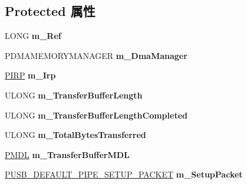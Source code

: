 \subsection*{Protected 属性}
\begin{DoxyCompactItemize}
\item 
\mbox{\label{class_c_u_s_b_request_aea79c036033f827d93c26d278507f997}} 
L\+O\+NG {\bfseries m\+\_\+\+Ref}
\item 
\mbox{\label{class_c_u_s_b_request_a667351393fa6f43d8e0aefec87b47b4f}} 
P\+D\+M\+A\+M\+E\+M\+O\+R\+Y\+M\+A\+N\+A\+G\+ER {\bfseries m\+\_\+\+Dma\+Manager}
\item 
\mbox{\label{class_c_u_s_b_request_a9645ef535d544a409654948efe0cfce8}} 
\hyperlink{interfacevoid}{P\+I\+RP} {\bfseries m\+\_\+\+Irp}
\item 
\mbox{\label{class_c_u_s_b_request_a9551657a034fbbcfe6aeb966f3c8d4b7}} 
U\+L\+O\+NG {\bfseries m\+\_\+\+Transfer\+Buffer\+Length}
\item 
\mbox{\label{class_c_u_s_b_request_a118937ac2786cf2abd1a2931edc888bb}} 
U\+L\+O\+NG {\bfseries m\+\_\+\+Transfer\+Buffer\+Length\+Completed}
\item 
\mbox{\label{class_c_u_s_b_request_a4c78a48166d5d6bc5eb7d861914151ae}} 
U\+L\+O\+NG {\bfseries m\+\_\+\+Total\+Bytes\+Transferred}
\item 
\mbox{\label{class_c_u_s_b_request_a65e300fc822fbaed6528c35e64846dce}} 
\hyperlink{interfacevoid}{P\+M\+DL} {\bfseries m\+\_\+\+Transfer\+Buffer\+M\+DL}
\item 
\mbox{\label{class_c_u_s_b_request_abf9c20422eb976b305354dc9328b1d74}} 
\hyperlink{struct___u_s_b___d_e_f_a_u_l_t___p_i_p_e___s_e_t_u_p___p_a_c_k_e_t}{P\+U\+S\+B\+\_\+\+D\+E\+F\+A\+U\+L\+T\+\_\+\+P\+I\+P\+E\+\_\+\+S\+E\+T\+U\+P\+\_\+\+P\+A\+C\+K\+ET} {\bfseries m\+\_\+\+Setup\+Packet}
\item 
\mbox{\label{class_c_u_s_b_request_a86f6aff76828aeebed22981a35fbb3e5}} 

\end{DoxyCompactItemize}
